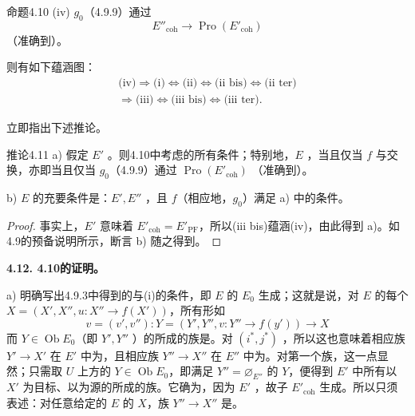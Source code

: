 \begin{SGAresult}{命题}{4.10}
(iv)  $g_0$（4.9.9）通过
\[
E''_{\mathrm{coh}}\longrightarrow\operatorname{Pro}(E'_{\mathrm{coh}})\tag{4.10.5}
\]
（准确到）。

则有如下蕴涵图：
\[
\begin{gathered}
\text{(iv)}\Rightarrow\text{(i)}\Leftrightarrow\text{(ii)}\Leftrightarrow\text{(ii bis)}\Leftrightarrow\text{(ii ter)}\\
\Rightarrow\text{(iii)}\Leftrightarrow\text{(iii bis)}\Leftrightarrow\text{(iii ter)}.
\end{gathered}
\tag{4.10.6}
\]
\end{SGAresult}
立即指出下述推论。
\begin{SGAresult}{推论}{4.11}
a) 假定 $E'$ 。则4.10中考虑的所有条件；特别地，$E$ ，当且仅当 $f$ 与交换，亦即当且仅当 $g_0$（4.9.9）通过 $\operatorname{Pro}(E'_{\mathrm{coh}})$ （准确到）。

b) $E$ 的充要条件是：$E',E''$ ，且 $f$（相应地，$g_0$）满足 a) 中的条件。
\end{SGAresult}
\begin{proof}
事实上，$E'$ 意味着 $E'_{\mathrm{coh}}=E'_{\mathrm{PF}}$，所以(iii bis)蕴涵(iv)，由此得到 a)。如4.9的预备说明所示，断言 b) 随之得到。
\end{proof}

\textbf{4.12. 4.10的证明。}

a) 明确写出4.9.3中得到的与(i)的条件，即 $E$ 的 $E_0$ 生成；这就是说，对 $E$ 的每个 $X=(X',X'',u:X''\to f(X'))$，所有形如
\[
v=(v',v''):Y=(Y',Y'',v:Y''\longrightarrow f(y'))\longrightarrow X
\]
而 $Y\in\operatorname{Ob}E_0$（即 $Y',Y''$ ）的所成的族是。对 $(i^*,j^*)$ ，所以这也意味着相应族 $Y'\to X'$ 在 $E'$ 中为，且相应族 $Y''\to X''$ 在 $E''$ 中为。对第一个族，这一点显然；只需取 $U$ 上方的 $Y\in\operatorname{Ob}E_0$，即满足 $Y''=\varnothing_{E''}$ 的 $Y$，便得到 $E'$ 中所有以 $X'$ 为目标、以为源的所成的族。它确为，因为 $E'$ ，故子 $E'_{\mathrm{coh}}$ 生成。所以只须表述：对任意给定的 $E$ 的 $X$，族 $Y''\to X''$ 是。

